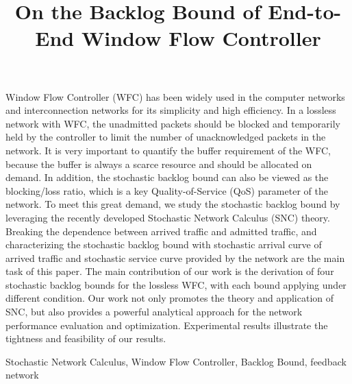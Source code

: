 \documentclass[paper]{ieice}
\title{On the Backlog Bound of End-to-End Window Flow Controller}
\begin{document}
\maketitle
\begin{summary}
Window Flow Controller (WFC) has been widely used in the computer networks and interconnection networks for its simplicity and high efficiency. In a lossless network with WFC, the unadmitted packets should be blocked and temporarily held by the controller to limit the number of unacknowledged packets in the network. It is very important to quantify the buffer requirement of the WFC, because the buffer is always a scarce resource and should be allocated on demand. In addition, the stochastic backlog bound can also be viewed as the blocking/loss ratio, which is a key Quality-of-Service (QoS) parameter of the network. To meet this great demand, we study the stochastic backlog bound by leveraging the recently developed Stochastic Network Calculus (SNC) theory. Breaking the dependence between arrived traffic and admitted traffic, and characterizing the stochastic backlog bound with stochastic arrival curve of arrived traffic and stochastic service curve provided by the network are the main task of this paper. The main contribution of our work is the derivation of four stochastic backlog bounds for the lossless WFC, with each bound applying under different condition. Our work not only promotes the theory and application of SNC, but also provides a powerful analytical approach for the network performance evaluation and optimization. Experimental results illustrate the tightness and feasibility of our results. %
\end{summary}
\begin{keywords}
Stochastic Network Calculus, Window Flow Controller, Backlog Bound, feedback network
\end{keywords}
\end{document}
